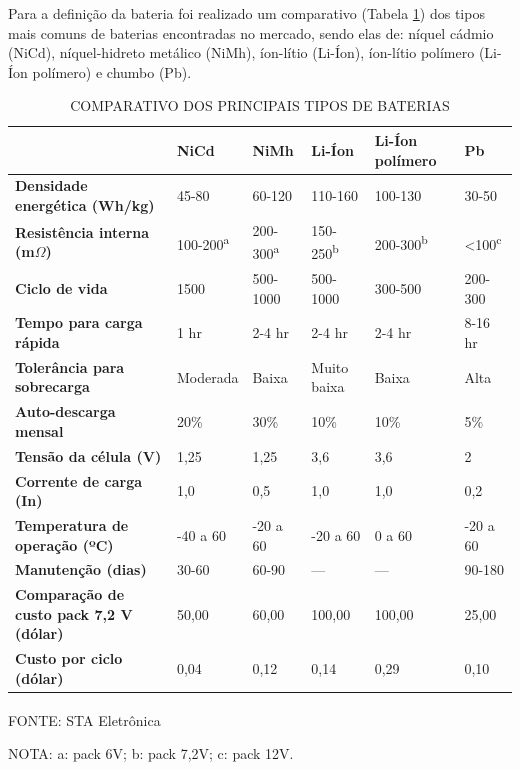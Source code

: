\documentclass[
	12pt,				%
	openright,			%
	oneside,			%
	a4paper,			%
	english,			%
	french,				%
	spanish,			%
	brazil,				%
	oldfontcommands
	]{abntex2}
\begin{document}
	Para a definição da bateria foi realizado um comparativo (Tabela \ref{Tab_Bateria}) dos tipos mais comuns de baterias encontradas no mercado, sendo elas de: níquel cádmio (NiCd), níquel-hidreto metálico (NiMh), íon-lítio (Li-Íon), íon-lítio polímero (Li-Íon polímero) e chumbo (Pb).
		
	\begin{table}[th]
		\caption{COMPARATIVO DOS PRINCIPAIS TIPOS DE BATERIAS}
		\label{Tab_Bateria}
		\begin{tabular}{p{3.5cm}|p{1.6cm}|p{1.6cm}|p{1.6cm}|p{2cm}|p{1.6cm}}
	 	& \textbf{NiCd} & \textbf{NiMh} & \textbf{Li-Íon} & \textbf{Li-Íon polímero} & \textbf{Pb} \\
	 	\hline
		\textbf{Densidade energética (Wh/kg)} & 45-80 & 60-120 & 110-160 & 100-130 & 30-50 \\
	 	\hline
	 	\textbf{Resistência interna (m$\Omega$)} & 100-200\textsuperscript{a} & 200-300\textsuperscript{a} & 150-250\textsuperscript{b} & 200-300\textsuperscript{b} & <100\textsuperscript{c} \\
	 	\hline
	 	\textbf{Ciclo de vida} & 1500 & 500-1000 & 500-1000 & 300-500 & 200-300 \\
		\hline
		\textbf{Tempo para carga rápida} & 1 hr & 2-4 hr & 2-4 hr & 2-4 hr & 8-16 hr \\
		\hline
		\textbf{Tolerância para sobrecarga} & Moderada & Baixa & Muito baixa & Baixa & Alta \\
		\hline
		\textbf{Auto-descarga mensal} & 20\% & 30\% & 10\% & 10\% & 5\% \\
		\hline
		\textbf{Tensão da célula (V)} & 1,25 & 1,25 & 3,6 & 3,6 & 2 \\
		\hline
		\textbf{Corrente de carga (In)} & 1,0 & 0,5 & 1,0 & 1,0 & 0,2 \\
		\hline
		\textbf{Temperatura de operação (ºC)} & -40 a 60 & -20 a 60 & -20 a 60 & 0 a 60 & -20 a 60 \\
		\hline
		\textbf{Manutenção (dias)} & 30-60 & 60-90 & --- & --- & 90-180 \\
		\hline
		\textbf{Comparação de custo pack 7,2 V (dólar)} & 50,00 & 60,00 & 100,00 & 100,00 & 25,00 \\
		\hline
		\textbf{Custo por ciclo (dólar)} & 0,04 & 0,12 & 0,14 & 0,29 & 0,10 \\
		\hline 
		\end{tabular}
	\centering
	\begin{small}
	\vspace{3pt}
		FONTE: STA Eletrônica\textsuperscript{\cite{sta}}
	\end{small}
	
	\begin{footnotesize}
		NOTA: a: pack 6V; b: pack 7,2V; c: pack 12V.
	\end{footnotesize}

\end{table}
	
\end{document}
